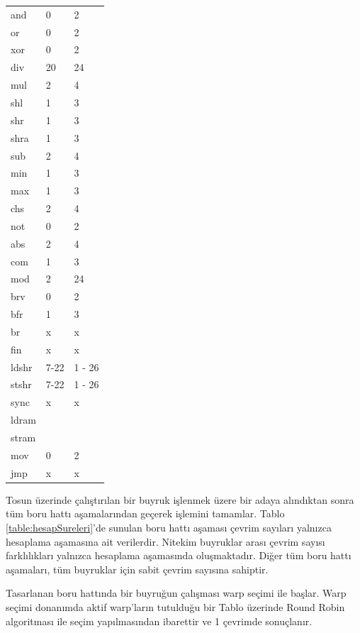 \begin{longtable}{p{50pt} p{90pt} p{90pt}}
  and 		&	  0 &  2 \\
  or 		  &	  0 &  2 \\
  xor		  &	  0 &  2 \\
  div  		&  20 & 24 \\
  mul  		&   2 &  4 \\
  shl  		&   1 &  3 \\
  shr  		&   1 &  3 \\
  shra  	&   1 &  3 \\
  sub  		&   2 &  4 \\
  min  		&   1 &  3 \\
  max  		&   1 &  3 \\
  chs  		&   2 &  4 \\
  not  		&   0 &  2 \\
  abs  		&   2 &  4 \\
  com  		&   1 &  3 \\
  mod  		&   2 & 24 \\
  brv 		&	  0 &  2 \\
  bfr 		&	  1 &  3 \\
  br 			&	  x &  x \\
  fin 		&	  x &  x \\
  ldshr 	&	 7-22 & 1 - 26 \\
  stshr 	&	 7-22 & 1 - 26 \\
  sync		&	  x  & x \\
  ldram 	&	   &  \\
  stram		&	   &  \\
  mov 		&    0 & 2 \\
  jmp  		&    x & x \\
  
\end{longtable}

Tosun üzerinde çalıştırılan bir buyruk işlenmek üzere bir adaya alındıktan sonra tüm boru hattı aşamalarından geçerek işlemini tamamlar. Tablo \ref{table:hesapSureleri}'de sunulan boru hattı aşaması çevrim sayıları yalnızca hesaplama aşamasına ait verilerdir. Nitekim buyruklar arası çevrim sayısı farklılıkları yalnızca hesaplama aşamasında oluşmaktadır. Diğer tüm boru hattı aşamaları, tüm buyruklar için sabit çevrim sayısına sahiptir.\par

Tasarlanan boru hattında bir buyruğun çalışması warp seçimi ile başlar. Warp seçimi donanımda aktif warp'ların tutulduğu bir Tablo üzerinde Round Robin algoritması ile seçim yapılmasından ibarettir ve 1 çevrimde sonuçlanır. \par 

